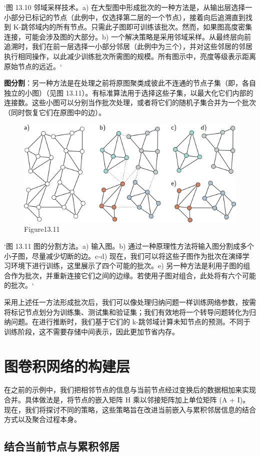 `图 13.10 邻域采样技术。a) 在大型图中形成批次的一种方法是，从输出层选择一小部分已标记的节点（此例中，仅选择第二层的一个节点），接着向后追溯直到找到 K-跳邻域内的所有节点。只需此子图即可训练该批次。然而，如果图高度密集连接，可能会涉及图的大部分。b) 一个解决策略是采用邻域采样。从最终层向前追溯时，我们在前一层选择一小部分邻居（此例中为三个），并对这些邻居的邻居执行相同操作，以此减少训练批次所需图的规模。所有图示中，亮度等级表示距离原始节点的远近。`

\textbf{图分割}：另一种方法是在处理之前将原图聚类成彼此不连通的节点子集（即，各自独立的小图）（见图 13.11）。有标准算法用于选择这些子集，以最大化它们内部的连接数。这些小图可以分别当作批次处理，或者将它们的随机子集合并为一个批次（同时恢复它们在原图中的边）。

\begin{figure}[ht!]
\centering
\includegraphics[width=0.7\linewidth]{png/chapter13/GraphPartitioning.png}
\caption{Figure13.11}
\end{figure}

`图 13.11 图的分割方法。a) 输入图。b) 通过一种原理性方法将输入图分割成多个小子图，尽量减少切断的边。c-d) 现在，我们可以将这些子图作为批次在演绎学习环境下进行训练，这里展示了四个可能的批次。e) 另一种方法是利用子图的组合作为批次，并重新连接它们之间的边缘。若使用子图对组合，此处将有六个可能的批次。`

采用上述任一方法形成批次后，我们可以像处理归纳问题一样训练网络参数，按需将标记节点划分为训练集、测试集和验证集；我们有效地将一个转导问题转化为归纳问题。在进行推断时，我们基于它们的 k-跳邻域计算未知节点的预测。不同于训练阶段，这不需要存储中间表示，因此更加节省内存。
\section{图卷积网络的构建层}
在之前的示例中，我们把相邻节点的信息与当前节点经过变换后的数据相加来实现合并。具体做法是，将节点的嵌入矩阵 H 乘以邻接矩阵加上单位矩阵 (A + I)。现在，我们将探讨不同的策略，这些策略旨在改进当前嵌入与累积邻居信息的结合方式以及聚合过程本身。

\subsection{结合当前节点与累积邻居}

